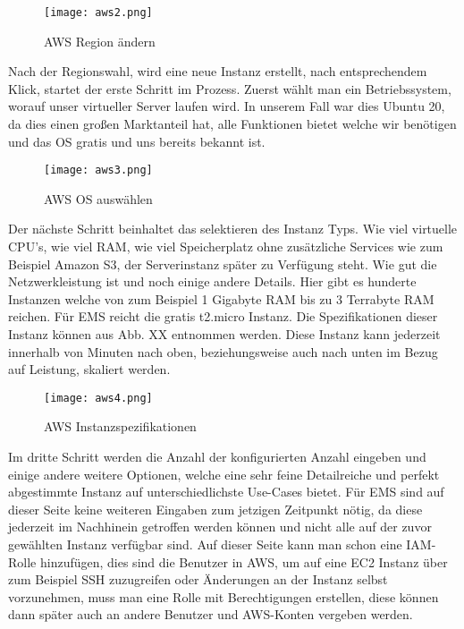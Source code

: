 \begin{center}
\begin{figure}[h]
    \centering
    \texttt{[image: aws2.png]}
    \caption{AWS Region ändern}
\end{figure}
\end{center}

Nach der Regionswahl, wird eine neue Instanz erstellt, nach entsprechendem Klick, startet der erste Schritt im Prozess. Zuerst wählt man ein Betriebssystem, worauf unser virtueller Server laufen wird. In unserem Fall war dies Ubuntu 20, da dies einen großen Marktanteil hat, alle Funktionen bietet welche wir benötigen und das OS gratis und uns bereits bekannt ist.

\begin{center}
\begin{figure}[h]
    \centering
    \texttt{[image: aws3.png]}
    \caption{AWS OS auswählen}
\end{figure}
\end{center}

Der nächste Schritt beinhaltet das selektieren des Instanz Typs. Wie viel virtuelle CPU's, wie viel RAM, wie viel Speicherplatz ohne zusätzliche Services wie zum Beispiel Amazon S3, der Serverinstanz später zu Verfügung steht. Wie gut die Netzwerkleistung ist und noch einige andere Details. Hier gibt es hunderte Instanzen welche von zum Beispiel 1 Gigabyte RAM bis zu 3 Terrabyte RAM reichen. Für EMS reicht die gratis t2.micro Instanz. Die Spezifikationen dieser Instanz können aus Abb. XX entnommen werden. Diese Instanz kann jederzeit innerhalb von Minuten nach oben, beziehungsweise auch nach unten im Bezug auf Leistung, skaliert werden.

\begin{center}
\begin{figure}[h]
    \centering
    \texttt{[image: aws4.png]}
    \caption{AWS Instanzspezifikationen}
\end{figure}
\end{center}

Im dritte Schritt werden die Anzahl der konfigurierten Anzahl eingeben und einige andere weitere Optionen, welche eine sehr feine Detailreiche und perfekt abgestimmte Instanz auf unterschiedlichste Use-Cases bietet. Für EMS sind auf dieser Seite keine weiteren Eingaben zum jetzigen Zeitpunkt nötig, da diese jederzeit im Nachhinein getroffen werden können und nicht alle auf der zuvor gewählten Instanz verfügbar sind. Auf dieser Seite kann man schon eine IAM-Rolle hinzufügen, dies sind die Benutzer in AWS, um auf eine EC2 Instanz über zum Beispiel SSH zuzugreifen oder Änderungen an der Instanz selbst vorzunehmen, muss man eine Rolle mit Berechtigungen erstellen, diese können dann später auch an andere Benutzer und AWS-Konten vergeben werden.

